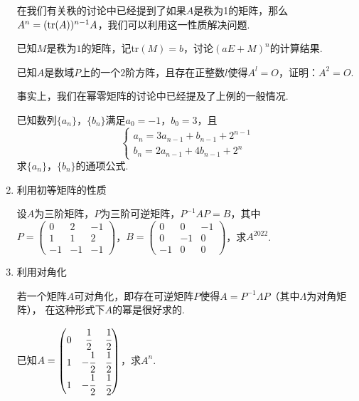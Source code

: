 \begin{enumerate}
	在我们有关秩的讨论中已经提到了如果$A$是秩为1的矩阵，那么$A^n=(\textup{tr}(A))^{n-1}A$，我们可以利用这一性质解决问题.
	\begin{example}
		已知$M$是秩为$1$的矩阵，记\textup{tr}$(M)=b$，讨论$(aE+M)^n$的计算结果.
	\end{example}

	\begin{example}
		已知$A$是数域$P$上的一个$2$阶方阵，且存在正整数$l$使得$A^l=O$，证明：$A^2=O$.
	\end{example}
	事实上，我们在幂零矩阵的讨论中已经提及了上例的一般情况.

	\begin{example}
		已知数列$\{a_n\}$，$\{b_n\}$满足$a_0=-1$，$b_0=3$，且
		$$\begin{cases}
			a_n=3a_{n-1}+b_{n-1}+2^{n-1} \\ b_n=2a_{n-1}+4b_{n-1}+2^n
		\end{cases}$$
		求$\{a_n\}$，$\{b_n\}$的通项公式.
	\end{example}
	\item 利用初等矩阵的性质
	\begin{example}
		设$A$为三阶矩阵，$P$为三阶可逆矩阵，$P^{-1}AP=B$，其中$P=\begin{pmatrix}
			0 & 2 & -1 \\ 1 & 1 & 2 \\ -1 & -1 & -1
		\end{pmatrix}$，$B=\begin{pmatrix}
			0 & 0 & -1 \\ 0 & -1 & 0 \\ -1 & 0 & 0
		\end{pmatrix}$，求$A^{2022}$.
	\end{example}

	\item 利用对角化
	
	若一个矩阵$A$可对角化，即存在可逆矩阵$P$使得$A=P^{-1}\Lambda P$（其中$\Lambda$为对角矩阵），
	在这种形式下$A$的幂是很好求的.
	\begin{example}
		已知$A=\begin{pmatrix}
			0 & \cfrac{1}{2} & \cfrac{1}{2} \\ 1 & -\cfrac{1}{2} & \cfrac{1}{2} \\ 1 & -\cfrac{1}{2} & \cfrac{1}{2}
		\end{pmatrix}$，求$A^n$.
	\end{example}

\end{enumerate}

